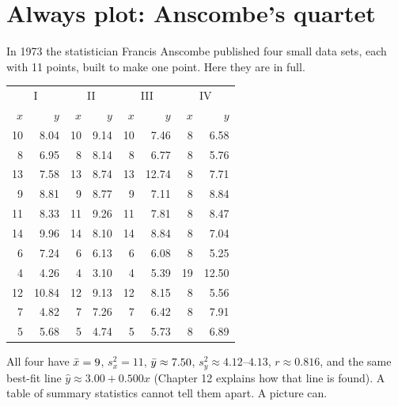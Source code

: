 \section{Always plot: Anscombe's quartet}
\label{sec:corr-anscombe}

In 1973 the statistician Francis Anscombe published four small data sets, each with
11 points, built to make one point. Here they are in full.

\begin{center}
\small
\begin{tabular}{rr|rr|rr|rr}
\toprule
\multicolumn{2}{c|}{I} & \multicolumn{2}{c|}{II} & \multicolumn{2}{c|}{III} & \multicolumn{2}{c}{IV} \\
$x$ & $y$ & $x$ & $y$ & $x$ & $y$ & $x$ & $y$ \\
\midrule
10 & 8.04 & 10 & 9.14 & 10 & 7.46 & 8 & 6.58 \\
8 & 6.95 & 8 & 8.14 & 8 & 6.77 & 8 & 5.76 \\
13 & 7.58 & 13 & 8.74 & 13 & 12.74 & 8 & 7.71 \\
9 & 8.81 & 9 & 8.77 & 9 & 7.11 & 8 & 8.84 \\
11 & 8.33 & 11 & 9.26 & 11 & 7.81 & 8 & 8.47 \\
14 & 9.96 & 14 & 8.10 & 14 & 8.84 & 8 & 7.04 \\
6 & 7.24 & 6 & 6.13 & 6 & 6.08 & 8 & 5.25 \\
4 & 4.26 & 4 & 3.10 & 4 & 5.39 & 19 & 12.50 \\
12 & 10.84 & 12 & 9.13 & 12 & 8.15 & 8 & 5.56 \\
7 & 4.82 & 7 & 7.26 & 7 & 6.42 & 8 & 7.91 \\
5 & 5.68 & 5 & 4.74 & 5 & 5.73 & 8 & 6.89 \\
\bottomrule
\end{tabular}
\end{center}

All four have $\bar{x} = 9$, $s_x^2 = 11$, $\bar{y} \approx 7.50$, $s_y^2 \approx
4.12$--$4.13$, $r \approx 0.816$, and the same best-fit line $\hat y \approx 3.00 + 0.500x$
(Chapter 12 explains how that line is found). A table of summary statistics
cannot tell them apart. A picture can.

